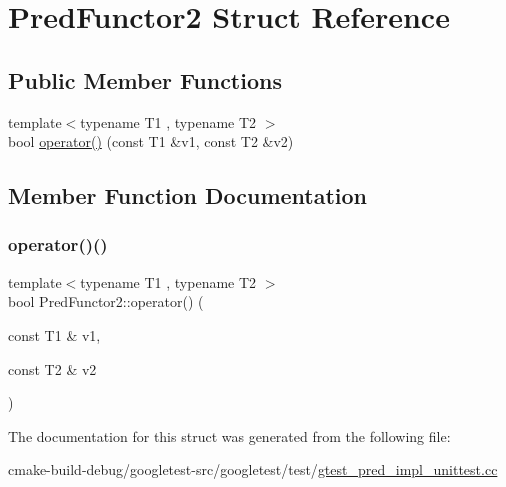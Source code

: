 \hypertarget{structPredFunctor2}{}\section{Pred\+Functor2 Struct Reference}
\label{structPredFunctor2}
\subsection*{Public Member Functions}
\begin{DoxyCompactItemize}
\item 
{\footnotesize template$<$typename T1 , typename T2 $>$ }\\bool \mbox{\hyperlink{structPredFunctor2_a2142c86e4c0a3139e167dd3f13eb7f6f}{operator()}} (const T1 \&v1, const T2 \&v2)
\end{DoxyCompactItemize}


\subsection{Member Function Documentation}
\mbox{\label{structPredFunctor2_a2142c86e4c0a3139e167dd3f13eb7f6f}} 
\subsubsection{\texorpdfstring{operator()()}{operator()()}}
{\footnotesize\ttfamily template$<$typename T1 , typename T2 $>$ \\
bool Pred\+Functor2\+::operator() (\begin{DoxyParamCaption}\item[{const T1 \&}]{v1,  }\item[{const T2 \&}]{v2 }\end{DoxyParamCaption})\hspace{0.3cm}{\ttfamily [inline]}}



The documentation for this struct was generated from the following file\+:\begin{DoxyCompactItemize}
\item 
cmake-\/build-\/debug/googletest-\/src/googletest/test/\mbox{\hyperlink{gtest__pred__impl__unittest_8cc}{gtest\+\_\+pred\+\_\+impl\+\_\+unittest.\+cc}}\end{DoxyCompactItemize}

